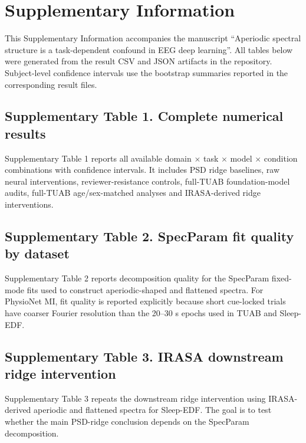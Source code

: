 \section*{Supplementary Information}

This Supplementary Information accompanies the manuscript ``Aperiodic spectral structure is a task-dependent confound in EEG deep learning''. All tables below were generated from the result CSV and JSON artifacts in the repository. Subject-level confidence intervals use the bootstrap summaries reported in the corresponding result files.

\subsection*{Supplementary Table 1. Complete numerical results}

Supplementary Table 1 reports all available domain $\times$ task $\times$ model $\times$ condition combinations with confidence intervals. It includes PSD ridge baselines, raw neural interventions, reviewer-resistance controls, full-TUAB foundation-model audits, full-TUAB age/sex-matched analyses and IRASA-derived ridge interventions.



\subsection*{Supplementary Table 2. SpecParam fit quality by dataset}

Supplementary Table 2 reports decomposition quality for the SpecParam fixed-mode fits used to construct aperiodic-shaped and flattened spectra. For PhysioNet MI, fit quality is reported explicitly because short cue-locked trials have coarser Fourier resolution than the 20--30 s epochs used in TUAB and Sleep-EDF.



\subsection*{Supplementary Table 3. IRASA downstream ridge intervention}

Supplementary Table 3 repeats the downstream ridge intervention using IRASA-derived aperiodic and flattened spectra for Sleep-EDF. The goal is to test whether the main PSD-ridge conclusion depends on the SpecParam decomposition.

